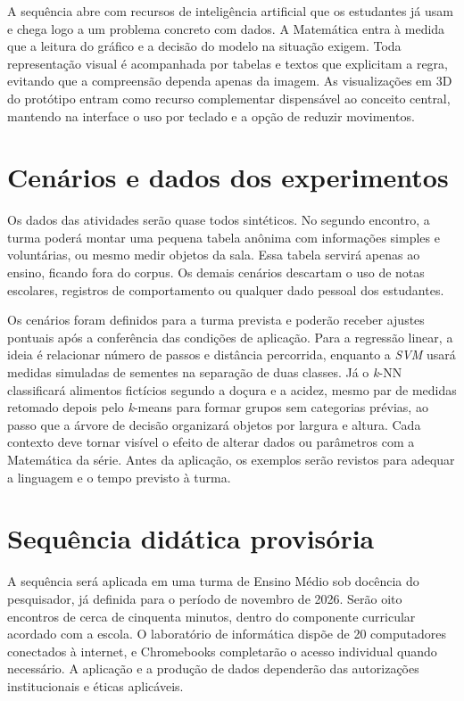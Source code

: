 A sequência abre com recursos de inteligência artificial que os estudantes já usam e chega logo a um problema concreto com dados. A Matemática entra à medida que a leitura do gráfico e a decisão do modelo na situação exigem. Toda representação visual é acompanhada por tabelas e textos que explicitam a regra, evitando que a compreensão dependa apenas da imagem. As visualizações em 3D do protótipo entram como recurso complementar dispensável ao conceito central, mantendo na interface o uso por teclado e a opção de reduzir movimentos.

\section{Cenários e dados dos experimentos}

Os dados das atividades serão quase todos sintéticos. No segundo encontro, a turma poderá montar uma pequena tabela anônima com informações simples e voluntárias, ou mesmo medir objetos da sala. Essa tabela servirá apenas ao ensino, ficando fora do corpus. Os demais cenários descartam o uso de notas escolares, registros de comportamento ou qualquer dado pessoal dos estudantes.

Os cenários foram definidos para a turma prevista e poderão receber ajustes pontuais após a conferência das condições de aplicação. Para a regressão linear, a ideia é relacionar número de passos e distância percorrida, enquanto a \textit{SVM} usará medidas simuladas de sementes na separação de duas classes. Já o \textit{k}-NN classificará alimentos fictícios segundo a doçura e a acidez, mesmo par de medidas retomado depois pelo \textit{k}-means para formar grupos sem categorias prévias, ao passo que a árvore de decisão organizará objetos por largura e altura. Cada contexto deve tornar visível o efeito de alterar dados ou parâmetros com a Matemática da série. Antes da aplicação, os exemplos serão revistos para adequar a linguagem e o tempo previsto à turma.

\section{Sequência didática provisória}

A sequência será aplicada em uma turma de Ensino Médio sob docência do pesquisador, já definida para o período de novembro de 2026. Serão oito encontros de cerca de cinquenta minutos, dentro do componente curricular acordado com a escola. O laboratório de informática dispõe de 20 computadores conectados à internet, e Chromebooks completarão o acesso individual quando necessário. A aplicação e a produção de dados dependerão das autorizações institucionais e éticas aplicáveis.

